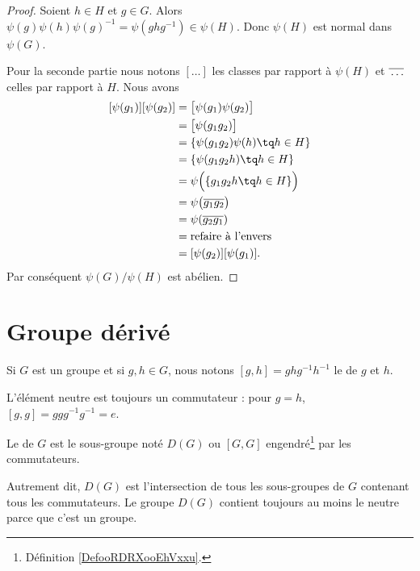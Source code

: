 \begin{proof}
    Soient \( h\in H\) et \( g\in G\). Alors \( \psi(g)\psi(h)\psi(g)^{-1}=\psi(ghg^{-1})\in\psi(H)\). Donc \( \psi(H)\) est normal dans \( \psi(G)\).

    Pour la seconde partie nous notons \( [\ldots]\) les classes par rapport à \( \psi(H)\) et \( \overline{ \vphantom{g}\ldots }\) celles par rapport à \( H\). Nous avons
    \begin{subequations}
        \begin{align}
            [\psi(g_1)][\psi(g_2)]&=\big[ \psi(g_1)\psi(g_2) \big]\\
            &=\big[ \psi(g_1g_2) \big]\\
            &=\{ \psi(g_1g_2)\psi(h)\tq h\in H \}\\
            &=\{ \psi(g_1g_2h)\tq h\in H \}\\
            &=\psi\Big(  \{ g_1g_2h\tq h\in H \}  \Big) \\
            &=\psi\big( \overline{ g_1g_2 } \big)\\
            &=\psi(\overline{ g_2g_1 })\\
            &=\text{refaire à l'envers}\\
            &=[\psi(g_2)][\psi(g_1)].
        \end{align}
    \end{subequations}
    Par conséquent \( \psi(G)/\psi(H)\) est abélien.
\end{proof}

\section{Groupe dérivé}

\begin{definition}
    Si \( G\) est un groupe et si \( g,h\in G\), nous notons \( [g,h]=ghg^{-1}h^{-1}\) le  de \( g\) et \( h\). 
\end{definition}

L'élément neutre est toujours un commutateur : pour \( g=h \), \( [g,g]=ggg^{-1}g^{-1}=e \).

\begin{definition}      \label{DEFooBNLPooShKYXa}
    Le  de \( G\) est le sous-groupe noté \( D(G)\) ou \( [G,G]\) engendré\footnote{Définition \ref{DefooRDRXooEhVxxu}.} par les commutateurs.
\end{definition}
Autrement dit, \( D(G)\) est l'intersection de tous les sous-groupes de \( G\) contenant tous les commutateurs. Le groupe \( D(G)\) contient toujours au moins le neutre parce que c'est un groupe.

